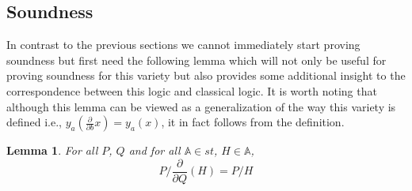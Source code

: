 \documentclass[a4paper,twoside,openright]{report}
\newcommand{\dd}[1]{\frac{\partial}{\partial #1}}
\newtheorem{lem}[theorem]{Lemma}
\begin{document}
\subsection{Soundness}
In contrast to the previous sections we cannot immediately start proving soundness but first need the following lemma which will not only be useful for proving soundness for this variety but also provides some additional insight to the correspondence between this logic and classical logic. It is worth noting that although this lemma can be viewed as a generalization of the way this variety is defined i.e., $y_a(\dd bx)=y_a(x)$, it in fact follows from the definition.
\begin{lem}\label{static gen lemma}
For all $P$, $Q$ and for all $\mathbb{A}\in st$, $H\in\mathbb{A}$,
\[
P/\dd Q(H) = P/H
\]
\end{lem}
\end{document}
